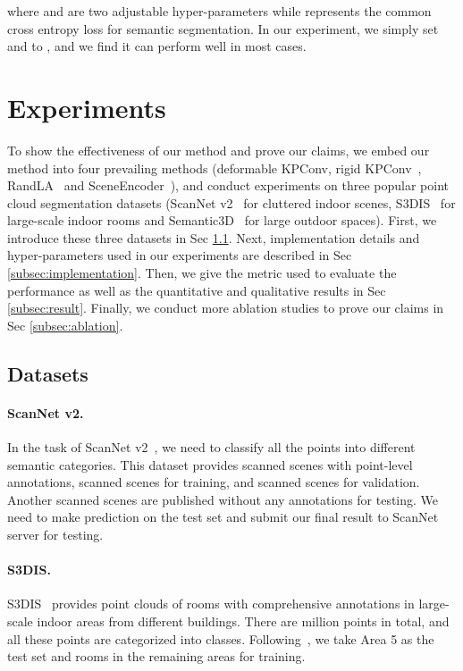 \documentclass[final]{cvpr}
\begin{document}
where  and  are two adjustable hyper-parameters while  represents the common cross entropy loss for semantic segmentation. In our experiment, we simply set  and  to , and we find it can perform well in most cases.

\section{Experiments}
\label{sec:exp}
To show the effectiveness of our method and prove our claims, we embed our method into four prevailing methods (deformable KPConv, rigid KPConv~\cite{thomas2019kpconv}, RandLA~\cite{hu2020randla} and SceneEncoder~\cite{xu2020sceneencoder}), and conduct experiments on three popular point cloud segmentation datasets (ScanNet v2~\cite{dai2017scannet} for cluttered indoor scenes, S3DIS~\cite{armeni20163d} for large-scale indoor rooms and Semantic3D~\cite{hackel2017semantic3d} for large outdoor spaces). First, we introduce these three datasets in Sec \ref{subsec:datasets}. Next, implementation details and hyper-parameters used in our experiments are described in Sec \ref{subsec:implementation}. Then, we give the metric used to evaluate the performance as well as the quantitative and qualitative results in Sec \ref{subsec:result}. Finally, we conduct more ablation studies to prove our claims in Sec \ref{subsec:ablation}.

\subsection{Datasets}
\label{subsec:datasets}
\paragraph{ScanNet v2.} In the task of ScanNet v2~\cite{dai2017scannet}, we need to classify all the points into  different semantic categories. This dataset provides  scanned scenes with point-level annotations,  scanned scenes for training, and  scanned scenes for validation. Another  scanned scenes are published without any annotations for testing. We need to make prediction on the test set and submit our final result to ScanNet server for testing. 

\paragraph{S3DIS.} S3DIS~\cite{armeni20163d} provides point clouds of  rooms with comprehensive annotations in  large-scale indoor areas from  different buildings. There are  million points in total, and all these points are categorized into  classes.  Following~\cite{qi2017pointnet, thomas2019kpconv}, we take Area 5 as the test set and rooms in the remaining areas for training.
\end{document}
